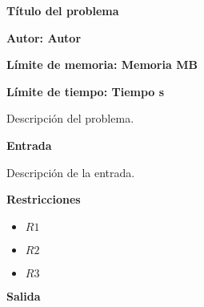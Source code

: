 \documentclass{article}
\newenvironment{ConstraintList}
{
	\vspace{-2mm}
	\begin{itemize}
}
{
	\end{itemize}
}
\newcommand{\spanishProblemHeader}[4]{
	\begin{center} {\huge \sf \bfseries #1} \end{center}
	\vspace{-2mm}
	\centerline{\sf \bfseries Autor: #2}
	\vspace{1mm}
	\centerline{\sf \bfseries Límite de memoria: #3}
	\vspace{1mm}
	\centerline{\sf \bfseries Límite de tiempo: #4}
	\vspace{10mm}
}
\newcommand{\printSubtitle}[1]{
	\vspace{1mm}
	\begin{flushleft} {\Large \sf \bfseries #1 \newline} \end{flushleft}
	\vspace{-4mm}
}
\begin{document}


\spanishProblemHeader{Título del problema}{Autor}{Memoria MB}{Tiempo s}




Descripción del problema.
\newline




\printSubtitle{Entrada}

Descripción de la entrada.
\newline




\printSubtitle{Restricciones}

\begin{ConstraintList}
	\item $ R1 $
	\item $ R2 $
	\item $ R3 $
\end{ConstraintList}




\printSubtitle{Salida}
\end{document}
